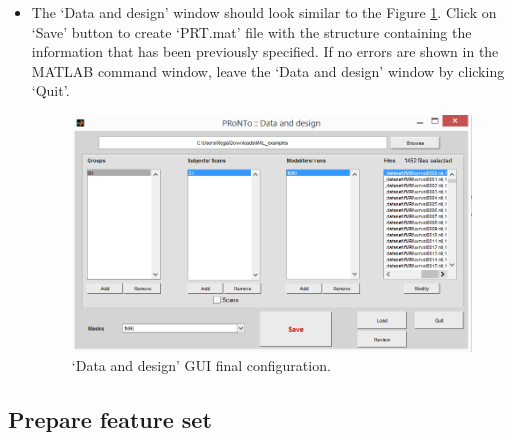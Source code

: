 \begin{itemize}
	\item The `Data and design' window should look similar to the Figure \ref{fig:finalDesign}. Click on `Save' button to create `PRT.mat' file with the structure containing the information that has been previously specified. If no errors are shown in the MATLAB command window, leave the `Data and design' window by clicking `Quit'.
	

\begin{figure}[!h]
	\centering
		\includegraphics[scale=0.7]{images/Tutorial/classification/finalDesign.png}
	\caption{`Data and design' GUI final configuration.}
	\label{fig:finalDesign}
\end{figure}	

\end{itemize}


\subsection{Prepare feature set}


